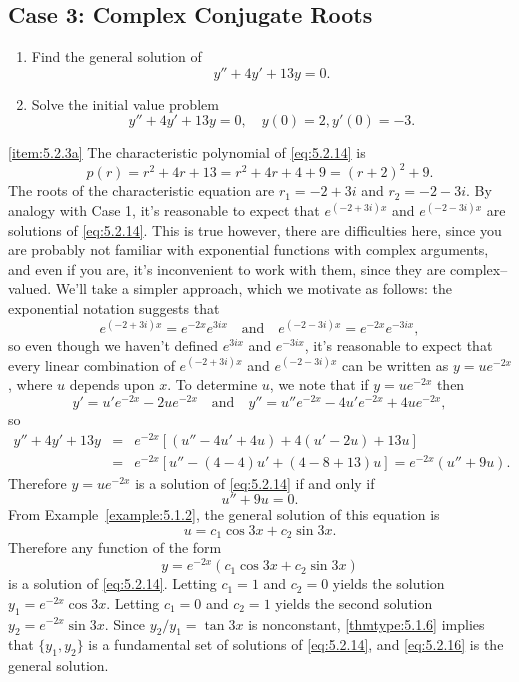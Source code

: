\documentclass{ximera}
\begin{document}
 
\subsection*{Case 3: Complex Conjugate Roots}
 
\begin{example}\label{example:5.2.3}
\begin{enumerate}
\item \label{item:5.2.3a}%
Find the general solution of
\begin{equation} \label{eq:5.2.14}
y''+4y'+13y=0.
\end{equation}
 
\item \label{item:5.2.3b}%
Solve the initial value problem
\begin{equation} \label{eq:5.2.15}
y''+4y'+13y=0, \quad   y(0)=2,  y'(0)=-3.
\end{equation}
\end{enumerate}
 
\begin{explanation}
\ref{item:5.2.3a} The characteristic
polynomial of
 \eqref{eq:5.2.14} is
$$
p(r)=r^2+4r+13=r^2+4r+4+9=(r+2)^2+9.
$$
The roots of the characteristic equation are $r_1=-2+3i$ and
$r_2=-2-3i$. By analogy with Case 1, it's reasonable to expect that
$e^{(-2+3i)x}$ and $e^{(-2-3i)x}$ are solutions of \eqref{eq:5.2.14}. This
is true %
however, there are
difficulties here, since you are probably not familiar with
exponential functions with complex arguments, and even if you are, it's
 inconvenient to work with them, since they are complex--valued. We'll
 take a simpler approach, which we motivate as follows: the
exponential notation suggests that
$$
e^{(-2+3i)x}=e^{-2x}e^{3ix}\quad\mbox{and}\quad
e^{(-2-3i)x}=e^{-2x}e^{-3ix},
$$
so even though we haven't defined $e^{3ix}$ and $e^{-3ix}$, it's
reasonable to expect that every linear
combination of $e^{(-2+3i)x}$ and $e^{(-2-3i)x}$ can be written as
$y=ue^{-2x}$, where $u$ depends upon $x$. To determine $u$, we note
that if $y=ue^{-2x}$ then
$$
y'=u'e^{-2x}-2ue^{-2x}\quad\mbox{and}\quad
y''=u''e^{-2x}-4u'e^{-2x}+4ue^{-2x},
$$
so
\begin{eqnarray*}
y''+4y'+13y&=&e^{-2x}\left[(u''-4u'+4u)+4(u'-2u)+13u\right]\\
&=&e^{-2x}\left[u''-(4-4)u'+(4-8+13)u\right]=e^{-2x}(u''+9u).
\end{eqnarray*}
Therefore $y=ue^{-2x}$ is a solution of \eqref{eq:5.2.14} if and only if
$$
u''+9u=0.
$$
From Example~\ref{example:5.1.2}, the  general solution of this equation is
$$
u=c_1\cos 3x +c_2\sin 3x.
$$
 Therefore any function of the form
\begin{equation} \label{eq:5.2.16}
y=e^{-2x}(c_1\cos 3x+c_2\sin 3x)
\end{equation}
is  a solution of \eqref{eq:5.2.14}.
Letting $c_1=1$ and $c_2=0$  yields the solution
 $y_1=e^{-2x}\cos3x$. Letting $c_1=0$ and $c_2=1$
yields the second solution $y_2=e^{-2x}\sin3x$. Since
$y_2/y_1=\tan3x$
is nonconstant, \ref{thmtype:5.1.6} implies that   $\{y_1,y_2\}$ is
a fundamental set of solutions of \eqref{eq:5.2.14}, and \eqref{eq:5.2.16}
is the general solution.
 

\end{explanation}
\end{example}
\end{document}
